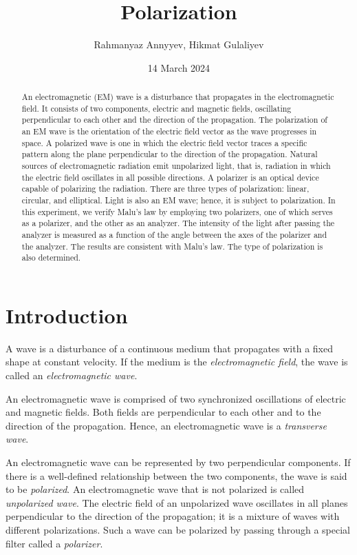 \documentclass[10pt]{article}
\title{Polarization}
\author{Rahmanyaz Annyyev, Hikmat Gulaliyev}
\date{14 March 2024}
\newcommand{\td}[1]{\todo[linecolor=blue, backgroundcolor=blue!25,bordercolor=blue, size=\small]{#1}}
\begin{document}
\maketitle

\begin{abstract}

An electromagnetic (EM) wave is a disturbance that propagates in the electromagnetic field. It consists of two components, electric and magnetic fields, oscillating perpendicular to each other and the direction of the propagation. The polarization of an EM wave is the orientation of the electric field vector as the wave progresses in space. A polarized wave is one in which the electric field vector traces a specific pattern along the plane perpendicular to the direction of the propagation. Natural sources of electromagnetic radiation emit unpolarized light, that is, radiation in which the electric field oscillates in all possible directions. A polarizer is an optical device capable of polarizing the radiation. There are three types of polarization: linear, circular, and elliptical. Light is also an EM wave; hence, it is subject to polarization. In this experiment, we verify Malu's law by employing two polarizers, one of which serves as a polarizer, and the other as an analyzer. The intensity of the light after passing the analyzer is measured as a function of the angle between the axes of the polarizer and the analyzer. The results are consistent with Malu's law. The type of polarization is also determined.

\end{abstract}

\section{Introduction}

\td{Add some references.}

A wave is a disturbance of a continuous medium that propagates with a fixed shape at constant velocity. If the medium is the \textit{electromagnetic field}, the wave is called an \textit{electromagnetic wave}. 

An electromagnetic wave is comprised of two synchronized oscillations of electric and magnetic fields. Both fields are perpendicular to each other and to the direction of the propagation. Hence, an electromagnetic wave is a \textit{transverse wave}.

An electromagnetic wave can be represented by two perpendicular components. If there is a well-defined relationship between the two components, the wave is said to be \textit{polarized}. An electromagnetic wave that is not polarized is called \textit{unpolarized wave}. The electric field of an unpolarized wave oscillates in all planes perpendicular to the direction of the propagation; it is a mixture of waves with different polarizations. Such a wave can be polarized by passing through a special filter called a \textit{polarizer}.
\end{document}
